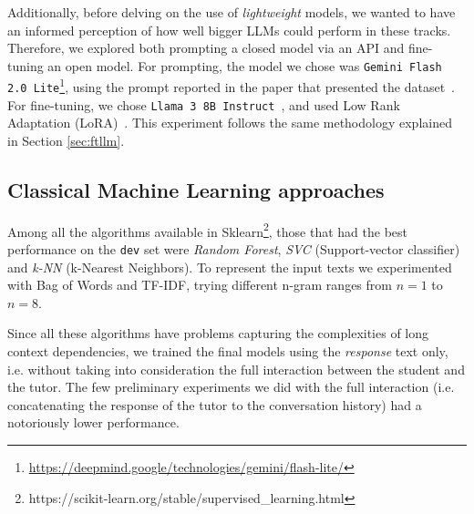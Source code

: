 \documentclass[11pt]{article}
\begin{document}
Additionally, before delving on the use of \textit{lightweight} models, we wanted to have an informed perception of how well bigger LLMs could perform in these tracks.
Therefore, we explored both prompting a closed model via an API and fine-tuning an open model.
For prompting, the model we chose was \texttt{Gemini Flash 2.0 Lite}\footnote{\url{https://deepmind.google/technologies/gemini/flash-lite/}}, using the prompt reported in the paper that presented the dataset~\citep{maurya-etal-2025-unifying}.
For fine-tuning, we chose \texttt{Llama 3 8B Instruct}~\cite{llama3modelcard}, and used Low Rank Adaptation (LoRA)~\cite{hu2022lora}.
This experiment follows the same methodology explained in Section \ref{sec:ftllm}.


\subsection{Classical Machine Learning approaches}
Among all the algorithms available in Sklearn\footnote{https://scikit-learn.org/stable/supervised\_learning.html}, those that had the best performance on the \texttt{dev} set were \textit{Random Forest}, \textit{SVC} (Support-vector classifier) and \textit{k-NN} (k-Nearest Neighbors).
To represent the input texts we experimented with Bag of Words and TF-IDF, trying different n-gram ranges from $n=1$ to $n=8$. 

Since all these algorithms have problems capturing the complexities of long context 
dependencies, we trained the final models using the \textit{response} text only, i.e. without taking into consideration the full interaction between the student and the tutor.
The few preliminary experiments we did with the full interaction (i.e. concatenating the response of the tutor to the conversation history) had a notoriously lower performance.
\end{document}
